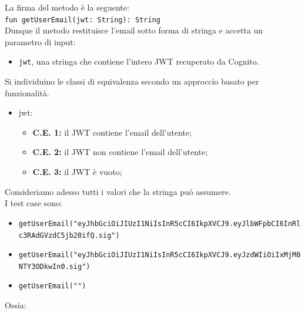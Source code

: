             \noindent La firma del metodo è la seguente:\\
            \texttt{fun getUserEmail(jwt: String): String} \\

            \noindent Dunque il metodo restituisce l'email sotto forma di stringa e accetta un parametro di input:
            \begin{itemize}
                \item\texttt{jwt}, una stringa che contiene l'intero JWT recuperato da Cognito. \\
            \end{itemize}

            \noindent Si individuino le classi di equivalenza secondo un approccio basato per funzionalità.

            \begin{itemize}
                \item jwt:
                    \begin{itemize}
                        \item\textbf{C.E. 1:} il JWT contiene l'email dell'utente;
                        \item\textbf{C.E. 2:} il JWT non contiene l'email dell'utente;
                        \item\textbf{C.E. 3:} il JWT è vuoto; \\
                    \end{itemize}
            \end{itemize}

            \noindent Consideriamo adesso tutti i valori che la stringa può assumere.\\
            
            \noindent I test case sono:

            \begin{itemize}
                \item\texttt{getUserEmail("eyJhbGciOiJIUzI1NiIsInR5cCI6IkpXVCJ9.eyJlbWFpbCI6InRlc3RAdGVzdC5jb20ifQ.sig")} %
                \item\texttt{getUserEmail("eyJhbGciOiJIUzI1NiIsInR5cCI6IkpXVCJ9.eyJzdWIiOiIxMjM0NTY3ODkwIn0.sig")} %
                \item\texttt{getUserEmail("")} %
            \end{itemize}

            Ossia:

